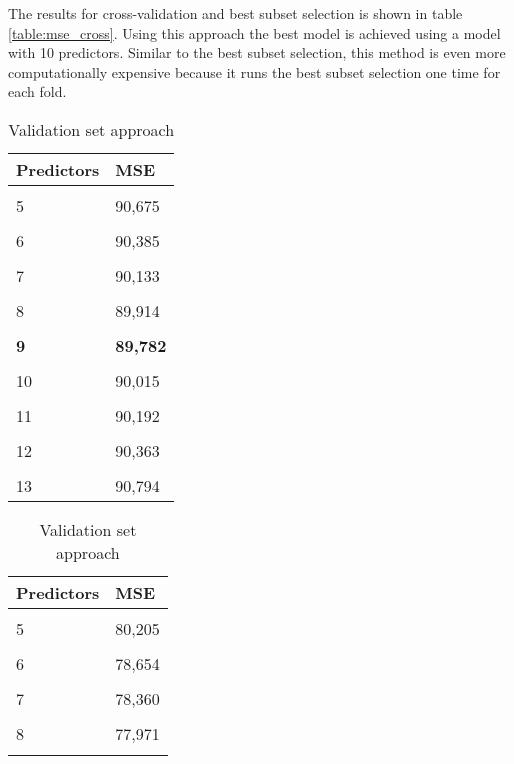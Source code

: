 The results for cross-validation and best subset selection is shown in table \ref{table:mse_cross}. Using this approach the best model is achieved using a model with 10 predictors. Similar to the best subset selection, this method is even more computationally expensive because it runs the best subset selection one time for each fold.

\begin{table}	
	\centering
	\begin{subtable}[t]{2in}
		\centering
		\begin{tabular}{ p{2.5cm} p{1.5cm}  }
			\textbf{Predictors} & \textbf{MSE} \\
			\hline 
			\\
			5 & 90,675  \\\hline
			\\
			6 & 90,385  \\\hline
			\\
			7 & 90,133  \\\hline
			\\
			8 & 89,914  \\\hline
			\\
			\textbf{9} & \textbf{89,782}  \\\hline
			\\
			10 & 90,015  \\\hline
			\\
			11 & 90,192  \\\hline
			\\
			12 & 90,363  \\\hline
			\\
			13 & 90,794  \\\hline
		\end{tabular}
		\caption{Validation set approach}\label{table:mse_validation}
	\end{subtable}
	\quad 
	\begin{subtable}[t]{2in}
		\centering
	\begin{tabular}{ p{2.5cm} p{1.5cm}  }
		\textbf{Predictors} & \textbf{MSE} \\
		\hline 
		\\
		5 & 80,205  \\\hline
		\\
		6 & 78,654  \\\hline
		\\
		7 & 78,360  \\\hline
		\\
		8 & 77,971  \\\hline
		\\

\end{tabular}
\end{subtable}
\end{table}

